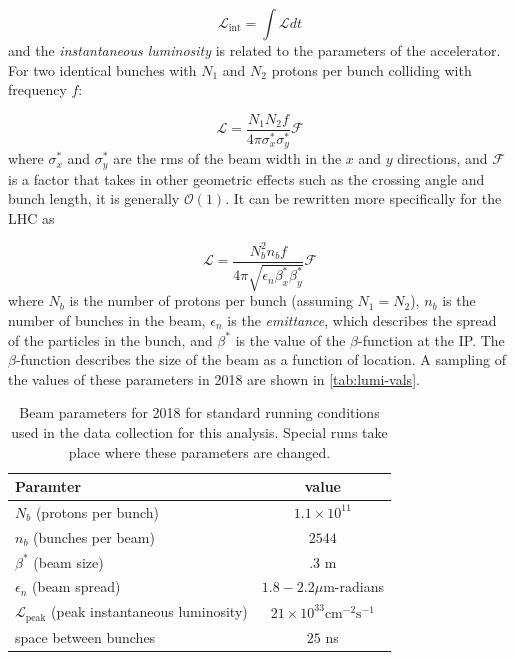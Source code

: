 \begin{equation}
\mathcal{L}_{\textrm{int}} = \int \mathcal{L} dt
\end{equation}
and the \emph{instantaneous luminosity} is related to the parameters of the accelerator. For two identical bunches with $N_1$ and $N_2$ protons per bunch colliding with frequency $f$:

\begin{equation}
\mathcal{L} = \frac{N_1 N_2 f}{4\pi \sigma_x^* \sigma_y^*} \mathcal{F}
\end{equation}
where $\sigma_x^*$ and  $\sigma_y^*$ are the \ac{rms} of the beam width in the $x$ and $y$ directions, and $\mathcal{F}$ is a factor that takes in other geometric effects such as the crossing angle and bunch length, it is generally $\mathcal{O}(1)$. It can be rewritten more specifically for the \ac{LHC} as

\begin{equation}
\mathcal{L} = \frac{N_b^2 n_b f }{4\pi \sqrt{\epsilon_n \beta^*_x \beta^*_y}}\mathcal{F}
\end{equation}
where $N_b$ is the number of protons per bunch (assuming $N_1 = N_2$), $n_b$ is the number of bunches in the beam, $\epsilon_n$ is the \emph{emittance}, which describes the spread of the particles in the bunch, and $\beta^*$ is the value of the $\beta$-function at the \ac{IP}. The $\beta$-function describes the size of the beam as a function of location. A sampling of the values of these parameters in 2018 are shown in \autoref{tab:lumi-vals}.


\begin{table}
\centering
\begin{tabular}{lc}
\hline
Paramter & value  \\
\hline
$N_b$ (protons per bunch)                                           & $1.1 \times 10^{11}$   \\
$n_b$ (bunches per beam)                                            & $2544$   \\
$\beta^*$ (beam size)                                               & $.3$ m   \\
$\epsilon_n$ (beam spread)                                          & $1.8-2.2 \mu$m-radians   \\
$\mathcal{L}_{\textrm{peak}}$ (peak instantaneous luminosity)       & $21 \times 10^{33} \textrm{cm}^{-2}\textrm{s}^{-1}$   \\
space between bunches                                               & $25$ ns   \\
\hline
\end{tabular}
\caption{Beam parameters for 2018 for standard running conditions used in the data collection for this analysis. Special runs take place where these parameters are changed.}
\label{tab:lumi-vals}
\end{table}

